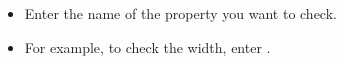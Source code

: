 
\begin{itemize}
\item Enter the name of the property you want to check.
\item For example, to check the width, enter .
\end{itemize}

